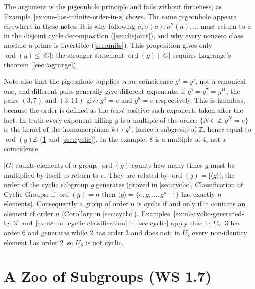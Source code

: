 \documentclass[11pt]{report}
\begin{document}
\begin{rembox}\label{rem:where-finiteness-enters}
The argument is the pigeonhole principle and fails without finiteness, as Example~\ref{ex:one-has-infinite-order-in-z} shows. The same pigeonhole appears elsewhere in these notes: it is why following $a, \sigma(a), \sigma^2(a), \ldots$ must return to $a$ in the disjoint cycle decomposition (\ref{sec:disjoint}), and why every nonzero class modulo a prime is invertible (\ref{sec:units}). This proposition gives only $\operatorname{ord}(g) \leq |G|$; the stronger statement $\operatorname{ord}(g) \mid |G|$ requires Lagrange's theorem (\ref{sec:lagrange}).

Note also that the pigeonhole supplies \emph{some} coincidence $g^i = g^j$, not a canonical one, and different pairs generally give different exponents: if $g^3 = g^7 = g^{11}$, the pairs $(3,7)$ and $(3,11)$ give $g^4 = e$ and $g^8 = e$ respectively. This is harmless, because the order is defined as the \emph{least} positive such exponent, taken after the fact. In truth every exponent killing $g$ is a multiple of the order: $\{N \in \mathbb{Z} : g^N = e\}$ is the kernel of the homomorphism $k \mapsto g^k$, hence a subgroup of $\mathbb{Z}$, hence equal to $\operatorname{ord}(g)\mathbb{Z}$ (\ref{sec:zoo} and \ref{sec:cyclic}). In the example, $8$ is a multiple of $4$, not a coincidence.
\end{rembox}

\begin{rembox}\label{rem:two-meanings-order}
$|G|$ counts elements of a group; $\operatorname{ord}(g)$ counts how many times $g$ must be multiplied by itself to return to $e$. They are related by $\operatorname{ord}(g) = |\langle g \rangle|$, the order of the cyclic subgroup $g$ generates (proved in \ref{sec:cyclic}, Classification of Cyclic Groups: if $\operatorname{ord}(g) = n$ then $\langle g \rangle = \{e, g, \ldots, g^{n-1}\}$ has exactly $n$ elements). Consequently a group of order $n$ is cyclic if and only if it contains an element of order $n$ (Corollary in \ref{sec:cyclic}). Examples~\ref{ex:u7-cyclic-generated-by-3} and~\ref{ex:u8-not-cyclic-classification} in \ref{sec:cyclic} apply this: in $U_7$, $3$ has order $6$ and generates while $2$ has order $3$ and does not; in $U_8$ every non-identity element has order $2$, so $U_8$ is not cyclic.
\end{rembox}

\section{A Zoo of Subgroups (WS 1.7)}\label{sec:zoo}
\end{document}
